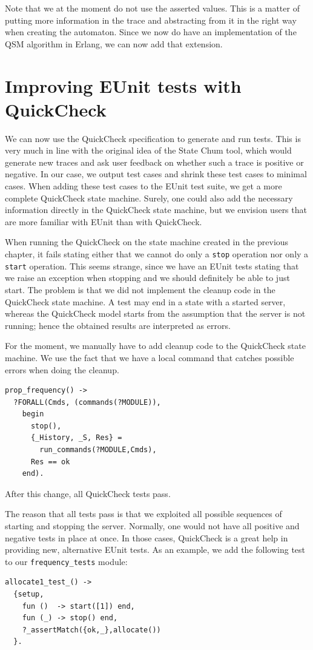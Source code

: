 \documentclass[]{sigplanconf}
\begin{document}
Note that we at the moment do not use the asserted values. This is a matter of putting more information in the trace and abstracting from it in the right way when creating the automaton. 
Since we now do have an implementation of the QSM algorithm in Erlang, we can now
add that extension.

\section{Improving EUnit tests with QuickCheck}

We can now use the QuickCheck specification to generate and run tests. This is very much in line with the original idea of the State Chum tool, which would generate new traces and ask user feedback on whether such a trace is positive or negative. In our case, we output test cases and shrink these test cases to minimal cases. When adding these test cases to the EUnit test suite, we get a more complete QuickCheck state machine. Surely, one could also add the necessary information directly in the QuickCheck state machine, but we envision users that are more familiar with EUnit than with QuickCheck.

When running the QuickCheck on the state machine created in the previous chapter, it fails stating either that we cannot do only a \texttt{stop} operation nor only a \texttt{start} operation.
This seems strange, since we have an EUnit tests stating that we raise an exception when stopping and we should definitely be able to just start. The problem is that we did not implement the cleanup code in the QuickCheck state machine. A test may end in a state with a started server, whereas the QuickCheck model starts from the assumption that the server is not running; hence the obtained results are interpreted as errors.

For the moment, we manually have to add cleanup code to the QuickCheck state machine. We use the fact that we have a local command that catches possible errors when doing the cleanup.
\begin{verbatim}
prop_frequency() ->
  ?FORALL(Cmds, (commands(?MODULE)),
    begin
      stop(),
      {_History, _S, Res} = 
        run_commands(?MODULE,Cmds), 
      Res == ok
    end).      
\end{verbatim}   
After this change, all QuickCheck tests pass.

The reason that all tests pass is that we exploited all possible sequences of starting and stopping the server. Normally, one would not have all positive and negative tests in place at once. In those cases, QuickCheck is a great help in providing new, alternative EUnit tests.
As an example, we add the following test to our \texttt{frequency\_tests} module:
\begin{verbatim}
allocate1_test_() ->
  {setup,
    fun ()  -> start([1]) end,  
    fun (_) -> stop() end,
    ?_assertMatch({ok,_},allocate())
  }.
\end{verbatim}
\end{document}
